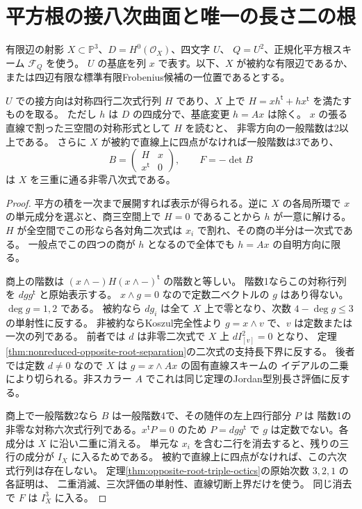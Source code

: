 \section{平方根の接八次曲面と唯一の長さ二の根}
\label{sec:tangent-determinantal-octics}
有限辺の射影 $X\subset\mathbb P^3$、$D=H^0(\mathcal O_X)$、四文字 $U$、
$Q=U^2$、正規化平方根スキーム $\mathcal F_Q$ を使う。
$U$ の基底を列 $x$ で表す。以下、$X$ が被約な有限辺であるか、
または四辺有限な標準有限Frobenius候補の一位置であるとする。
\begin{lemma}\label{lem:tangent-bordered-octic}
$U$ での接方向は対称四行二次式行列 $H$ であり、$X$ 上で
$H=xh^{\mathsf t}+hx^{\mathsf t}$ を満たすものを取る。
ただし $h$ は $D$ の四成分で、基底変更 $h=Ax$ は除く。
$x$ の張る直線で割った三空間の対称形式として $H$ を読むと、
非零方向の一般階数は2以上である。
さらに $X$ が被約で直線上に四点がなければ一般階数は3であり、
\[
 B=\begin{pmatrix}H&x\\x^{\mathsf t}&0\end{pmatrix},\qquad
 F=-\det B
\]
は $X$ を三重に通る非零八次式である。
\end{lemma}
\begin{proof}
平方の積を一次まで展開すれば表示が得られる。逆に $X$ の各局所環で
$x$ の単元成分を選ぶと、商三空間上で $H=0$ であることから $h$ が一意に解ける。
$H$ が全空間でこの形なら各対角二次式は $x_i$ で割れ、その商の半分は一次式である。
一般点でこの四つの商が $h$ となるので全体でも $h=Ax$ の自明方向に限る。

商上の階数は $(x\wedge -)H(x\wedge -)^{\mathsf t}$ の階数と等しい。
階数1ならこの対称行列を $dgg^{\mathsf t}$ と原始表示する。
$x\wedge g=0$ なので定数二ベクトルの $g$ はあり得ない。$\deg g=1,2$ である。
被約なら $d g_i$ は全て $X$ 上で零となり、次数 $4-\deg g\le3$ の単射性に反する。
非被約ならKoszul完全性より $g=x\wedge v$ で、$v$ は定数または一次の列である。
前者では $d$ は非零二次式で $X$ 上 $d I_{[v]}^2=0$ となり、
定理\ref{thm:nonreduced-opposite-root-separation}の二次式の支持長下界に反する。
後者では定数 $d\ne0$ なので $X$ は $g=x\wedge Ax$ の固有直線スキームの
イデアルの二乗により切られる。非スカラー $A$ でこれは同じ定理のJordan型別長さ評価に反する。

商上で一般階数2なら $B$ は一般階数4で、その随伴の左上四行部分 $P$ は
階数1の非零な対称六次式行列である。$x^{\mathsf t}P=0$ のため
$P=dgg^{\mathsf t}$ で $g$ は定数でない。各成分は $X$ に沿い二重に消える。
単元な $x_i$ を含む二行を消去すると、残りの三行の成分が $I_X$ に入るためである。
被約で直線上に四点がなければ、この六次式行列は存在しない。
定理\ref{thm:opposite-root-triple-octics}の原始次数 $3,2,1$ の各証明は、
二重消滅、三次評価の単射性、直線切断上界だけを使う。
同じ消去で $F$ は $I_X^3$ に入る。
\end{proof}

